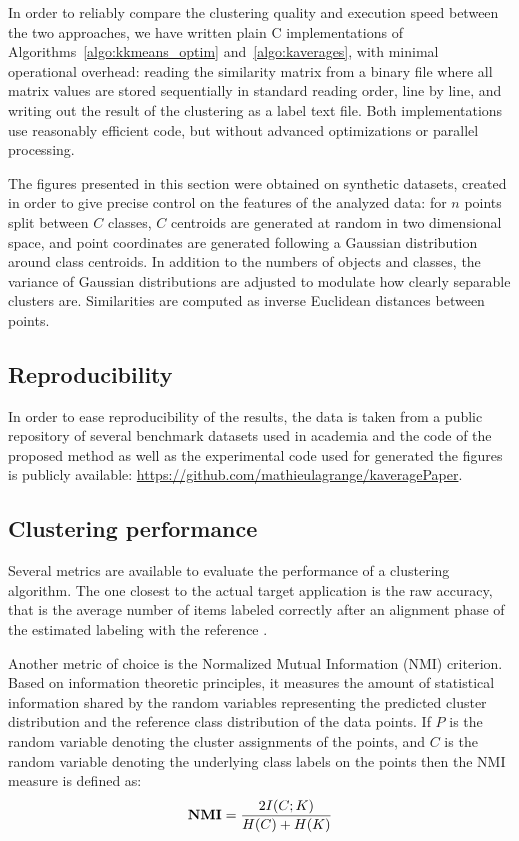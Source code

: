\documentclass[10pt,letterpaper]{article}
\begin{document}
In order to reliably compare the clustering quality and execution speed between the two approaches, we have written plain C implementations of Algorithms~\ref{algo:kkmeans_optim} and~\ref{algo:kaverages}, with minimal operational overhead: reading the similarity matrix from a binary file where all matrix values are stored sequentially in standard reading order, line by line, and writing out the result of the clustering as a label text file. Both implementations use reasonably efficient code, but without advanced optimizations or parallel processing.

The figures presented in this section were obtained on synthetic datasets, created in order to give precise control on the features of the analyzed data: for $n$ points split between $C$ classes, $C$ centroids are generated at random in two dimensional space, and point coordinates are generated following a Gaussian distribution around class centroids. In addition to the numbers of objects and classes, the variance of Gaussian distributions are adjusted to modulate how clearly separable clusters are. Similarities are computed as inverse Euclidean distances between points. %

\subsection{Reproducibility}

In order to ease reproducibility of the results, the data is taken from a public repository of several benchmark datasets used in academia \cite{UCRArchive} and the code of the proposed method as well as the experimental code used for generated the figures is publicly available: \url{https://github.com/mathieulagrange/kaveragePaper}.


\subsection{Clustering performance}

Several metrics are available to evaluate the performance of a clustering algorithm. The one closest to the actual target application is the raw accuracy, that is the average number of items labeled correctly after an alignment phase of the estimated labeling with the reference \cite{Kuhn1955Hungarian}.

Another metric of choice is the Normalized Mutual Information (NMI) criterion. Based on information theoretic principles, it measures the amount of statistical information shared by the random variables representing the predicted cluster distribution and the reference class distribution of the data points. If $P$ is the random variable denoting the cluster assignments of the points, and $C$ is the random variable denoting the underlying class labels on the points then the NMI measure is defined as:
\[
\textbf{NMI} = \frac{ 2\- I(C;K) }{H(C)+H(K)}
\]
\end{document}
